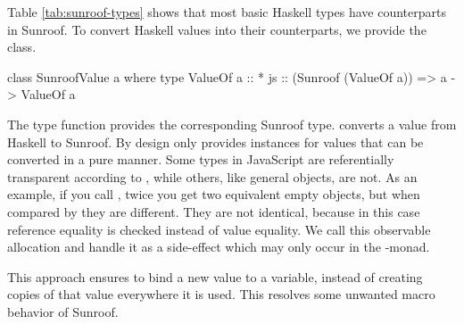 Table \ref{tab:sunroof-types} shows that most basic 
Haskell types have counterparts in
Sunroof. To convert Haskell values into their 
counterparts, we provide the  class.
\begin{Code}
class SunroofValue a where
  type ValueOf a :: *
  js :: (Sunroof (ValueOf a)) => a -> ValueOf a
\end{Code}
The type function
 \cite{Chakravarty:05:AssociatedTypeSynonyms} 
provides the corresponding Sunroof type.
 converts a value from Haskell to Sunroof. 
By design  
only provides instances for values that can be converted in a pure
manner. Some types in JavaScript are referentially 
transparent according to \Src{==}, while others, like general objects,
are not. As an example, if you call , twice you get two 
equivalent empty objects, but when compared by \Src{==} they are different. They
are not identical, because in this case reference equality is checked
instead of value equality. We call this observable allocation and handle 
it as a side-effect which may only occur in the \JS-monad. 

This approach ensures to bind a new value to a variable,
instead of creating copies of that value everywhere
it is used. This resolves some unwanted macro behavior 
of Sunroof.

\begin{comment}
Sunroof also offers the ability to work with record like data structures.
For this purpose Sunroof offers the \Src{JSTuple} type class.
\begin{Code}
class Sunroof o => JSTuple o where
  type Internals o
  match :: (Sunroof o) => o -> Internals o
  tuple :: Internals o -> JS t o
\end{Code}
If you have a record of Sunroof data that you want to
encode as a JavaScript object you can provide this ability 
by implementing \Src{JSTuple}. The \Src{Internals} type function
delivers your record type. Encoding that record as a \Src{Sunroof}
value is done through \Src{tuple}. 
Because of the observable allocation issue, we have to be 
inside the \JS-monad to do this.
Decomposing the encoding is done with \Src{match}. Because the
\Src{JSTuple} idiom is meant to represent immutable data structures, this 
can be done in a pure manner although there are ways to mutate 
values referenced by the decomposed record, since they are only 
references to the actual data in JavaScript.
\end{comment}

